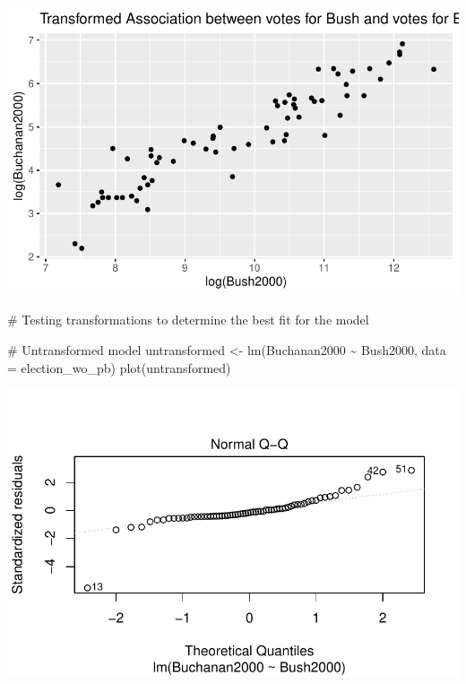 \documentclass[
  letterpaper,
  DIV=11,
  numbers=noendperiod]{scrartcl}
\newenvironment{Shaded}{\begin{snugshade}}{\end{snugshade}}
\newcommand{\AttributeTok}[1]{\textcolor[rgb]{0.40,0.45,0.13}{#1}}
\newcommand{\CommentTok}[1]{\textcolor[rgb]{0.37,0.37,0.37}{#1}}
\newcommand{\FunctionTok}[1]{\textcolor[rgb]{0.28,0.35,0.67}{#1}}
\newcommand{\NormalTok}[1]{\textcolor[rgb]{0.00,0.23,0.31}{#1}}
\newcommand{\OtherTok}[1]{\textcolor[rgb]{0.00,0.23,0.31}{#1}}
\newcommand{\SpecialCharTok}[1]{\textcolor[rgb]{0.37,0.37,0.37}{#1}}
\begin{document}
\includegraphics{case_study_1_files/figure-pdf/unnamed-chunk-6-2.pdf}

\begin{Shaded}
\begin{Highlighting}[]
\CommentTok{\# Testing transformations to determine the best fit for the model}

\CommentTok{\# Untransformed model}
\NormalTok{untransformed }\OtherTok{\textless{}{-}} \FunctionTok{lm}\NormalTok{(Buchanan2000 }\SpecialCharTok{\textasciitilde{}}\NormalTok{ Bush2000, }\AttributeTok{data =}\NormalTok{ election\_wo\_pb)}
\FunctionTok{plot}\NormalTok{(untransformed)}
\end{Highlighting}
\end{Shaded}

\includegraphics{case_study_1_files/figure-pdf/unnamed-chunk-6-3.pdf}
\end{document}
